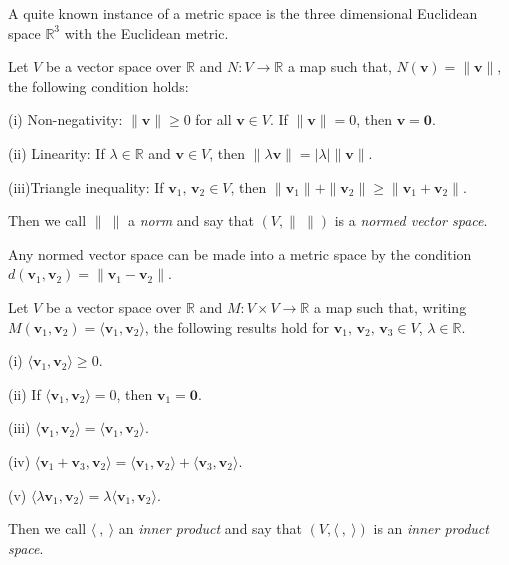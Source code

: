 A quite known instance of a metric space is the three dimensional
Euclidean space $\mathbb{R}^3$ with the Euclidean metric.


\begin{definition}\label{D;norm}
Let $V$ be a vector space over ${\mathbb R}$ and $N:V\rightarrow{\mathbb R}$ a map such that, $N({\mathbf v})=\|{\mathbf v}\|$, the following condition holds:
 
(i) Non-negativity: $\|{\mathbf v}\|\geq 0$ for all ${\mathbf v}\in V$. If $\|{\mathbf v}\|=0$, then ${\mathbf v}={\boldsymbol 0}$.

(ii) Linearity: If $\lambda\in{\mathbb R}$ and ${\mathbf v}\in V$,
then $\|\lambda{\mathbf v}\|=|\lambda| \|{\mathbf v}\|$.

(iii)Triangle inequality: If ${\mathbf v_1},\,{\mathbf v_2}\in V$, then 
$\|{\mathbf v_1}\|+\|{\mathbf v_2}\|\geq \|{\mathbf v_1}+{\mathbf v_2}\|$.

\noindent Then we call $\|\ \|$ a \emph{norm} and say that
$(V,\|\ \|)$ is a \emph{normed vector space}.
\end{definition}

Any normed vector space can be made into a metric space by the condition $d({\mathbf v_1},{\mathbf v_2})= \|{\mathbf v_1}-{\mathbf v_2}\|$.

\begin{definition}\label{D;inner product}
Let $V$ be a vector space over ${\mathbb R}$
and $M:V\times V\rightarrow{\mathbb R}$ a map such that,
writing $M({\mathbf v_1},{\mathbf v_2})
=\langle{\mathbf v_1},{\mathbf v_2}\rangle$, 
the following results
hold for ${\mathbf v_1},\,{\mathbf v_2},\,{\mathbf v_3}\in V$,
$\lambda\in{\mathbb R}$.

(i) $\langle{\mathbf v_1},{\mathbf v_2}\rangle\geq 0$.

(ii) If  $\langle{\mathbf v_1},{\mathbf v_2}\rangle=0$, then 
${\mathbf v_1}={\boldsymbol 0}$.

(iii)  $\langle{\mathbf v_1},{\mathbf v_2}\rangle
=\langle{\mathbf v_1},{\mathbf v_2}\rangle$.

(iv) $\langle{\mathbf v_1}+{\mathbf v_3},{\mathbf v_2}\rangle
=\langle{\mathbf v_1},{\mathbf v_2}\rangle
+\langle{\mathbf v_3},{\mathbf v_2}\rangle$.

(v) $\langle\lambda {\mathbf v_1},{\mathbf v_2}\rangle
=\lambda\langle{\mathbf v_1},{\mathbf v_2}\rangle$.

\noindent Then we call $\langle\ ,\  \rangle$ an 
\emph{inner product} and say that
$(V,\langle\ ,\  \rangle)$ is an \emph{inner product space}.
\end{definition}

